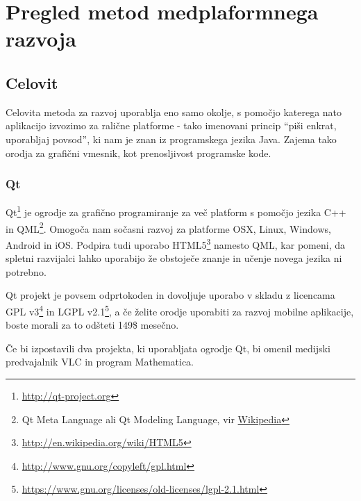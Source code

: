 \graphicspath{{img/}}









\chapter{Pregled metod medplaformnega razvoja}
\label{chap:overview}


\section{Celovit}

Celovita metoda za razvoj uporablja eno samo okolje, s pomočjo katerega nato aplikacijo izvozimo za ralične platforme - tako imenovani princip ``piši enkrat, uporabljaj povsod'', ki nam je znan iz programskega jezika Java. Zajema tako orodja za grafični vmesnik, kot prenosljivost programske kode.

\subsection{Qt}

Qt\footnote{\href{http://qt-project.org}{http://qt-project.org}} je ogrodje za grafično programiranje za več platform s pomočjo jezika C++ in QML\footnote{Qt Meta Language ali Qt Modeling Language, vir \href{http://en.wikipedia.org/wiki/QML}{Wikipedia}}. Omogoča nam sočasni razvoj za platforme OSX, Linux, Windows, Android in iOS. Podpira tudi uporabo HTML5\footnote{\href{http://en.wikipedia.org/wiki/HTML5}{http://en.wikipedia.org/wiki/HTML5}} namesto QML, kar pomeni, da spletni razvijalci lahko uporabijo že obstoječe znanje in učenje novega jezika ni potrebno.

Qt projekt je povsem odprtokoden in dovoljuje uporabo v skladu z licencama GPL v3\footnote{\href{http://www.gnu.org/copyleft/gpl.html}{http://www.gnu.org/copyleft/gpl.html}} in LGPL v2.1\footnote{\href{https://www.gnu.org/licenses/old-licenses/lgpl-2.1.html}{https://www.gnu.org/licenses/old-licenses/lgpl-2.1.html}}, a če želite orodje uporabiti za razvoj mobilne aplikacije, boste morali za to odšteti 149\$ mesečno.

Če bi izpostavili dva projekta, ki uporabljata ogrodje Qt, bi omenil medijski predvajalnik VLC in program Mathematica.

